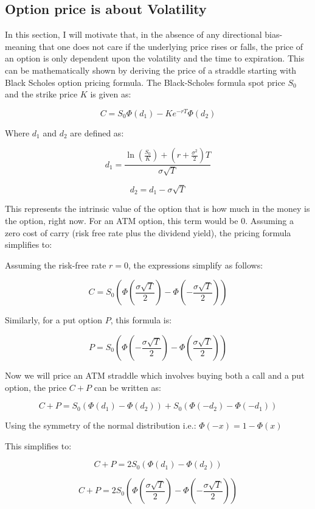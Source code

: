 \subsection{Option price is about Volatility}

In this section, I will motivate that, in the absence of any directional bias- meaning that one does not care if the underlying price rises or falls, the price of an option is only dependent upon the volatility and the time to expiration. This can be mathematically shown by deriving the price of a straddle starting with Black Scholes option pricing formula.  
The Black-Scholes formula spot price $S_0$ and the strike price $K$ is given as:

$$
C = S_0 \Phi(d_1) - K e^{-r T} \Phi(d_2)
$$

Where $d_1$ and $d_2$ are defined as:

$$
d_1 = \frac{\ln\left(\frac{S_0}{K}\right) + \left(r + \frac{\sigma^2}{2}\right)T}{\sigma \sqrt{T}}
$$

$$
d_2 = d_1 - \sigma \sqrt{T}
$$

This represents the intrinsic value of the option that is how much in the money is the option, right now. For an ATM option, this term would be 0. Assuming a zero cost of carry (risk free rate plus the dividend yield), the pricing formula simplifies to:

Assuming the risk-free rate \( r = 0 \), the expressions simplify as follows:

$$C = S_0 \left( \Phi(\frac{\sigma \sqrt{T}}{2}) - \Phi(-\frac{\sigma \sqrt{T}}{2}) \right)$$

Similarly, for a put option $P$, this formula is:

$$ P = S_0 \left( \Phi(-\frac{\sigma \sqrt{T}}{2}) - \Phi( \frac{\sigma \sqrt{T}}{2}) \right) $$

Now we will price an ATM straddle which involves buying both a call and a put option, the price $C + P$ can be written as:

$$C + P = S_0 \left( \Phi(d_1) - \Phi(d_2) \right) + S_0 \left( \Phi(-d_2) - \Phi(-d_1) \right)$$

Using the symmetry of the normal distribution i.e.: $\Phi(-x) = 1 - \Phi(x)$

This simplifies to:

$$C + P = 2 S_0 \left( \Phi(d_1) - \Phi(d_2) \right)$$

$$C + P = 2 S_0 \left( \Phi\left( \frac{\sigma \sqrt{T}}{2} \right) - \Phi\left( -\frac{\sigma \sqrt{T}}{2} \right) \right)$$

